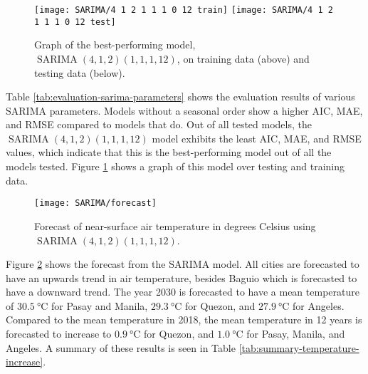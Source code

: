 	\begin{figure}
		\centering
		\texttt{[image: SARIMA/4 1 2 1 1 1 0 12 train]}
		\texttt{[image: SARIMA/4 1 2 1 1 1 0 12 test]}
		\caption{
			Graph of the best-performing model, $\operatorname{SARIMA}(4,1,2)(1,1,1,12)$, on training data (above) and testing data (below).
		}
		\label{fig:sarima-best-training-testing}
	\end{figure}

	Table \ref{tab:evaluation-sarima-parameters} shows the evaluation results of various SARIMA parameters.
	Models without a seasonal order show a higher AIC, MAE, and RMSE compared to models that do.
	Out of all tested models, the $\operatorname{SARIMA}(4,1,2)(1,1,1,12)$ model exhibits the least AIC, MAE, and RMSE values, which indicate that this is the best-performing model out of all the models tested. Figure \ref{fig:sarima-best-training-testing} shows a graph of this model over testing and training data.
	
	\begin{figure}
		\centering
		\texttt{[image: SARIMA/forecast]}
		\caption{
			Forecast of near-surface air temperature in degrees Celsius using $\operatorname{SARIMA}(4,1,2)(1,1,1,12)$.
		}
		\label{fig:sarima-forecast}
	\end{figure}

	Figure \ref{fig:sarima-forecast} shows the forecast from the SARIMA model.
	All cities are forecasted to have an upwards trend in air temperature, besides Baguio which is forecasted to have a downward trend.
	The year 2030 is forecasted to have a mean temperature of 
		$\qty{30.5}{\degreeCelsius}$ for Pasay and Manila,
		$\qty{29.3}{\degreeCelsius}$ for Quezon,
		and
		$\qty{27.9}{\degreeCelsius}$ for Angeles.
	Compared to the mean temperature in 2018, the mean temperature in 12 years is forecasted to increase to
		$\qty{0.9}{\degreeCelsius}$ for Quezon,
		and
		$\qty{1.0}{\degreeCelsius}$ for Pasay, Manila, and Angeles.
	A summary of these results is seen in Table \ref{tab:summary-temperature-increase}.
	
